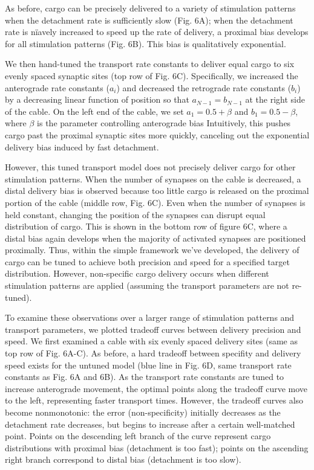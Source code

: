 \documentclass[11pt]{wlpeerj}
\begin{document}
As before, cargo can be precisely delivered to a variety of stimulation patterns when the detachment rate is sufficiently slow (Fig. 6A); when the detachment rate is n\"iavely increased to speed up the rate of delivery, a proximal bias develops for all stimulation patterns (Fig. 6B).
This bias is qualitatively exponential.

We then hand-tuned the transport rate constants to deliver equal cargo to six evenly spaced synaptic sites (top row of Fig. 6C).
Specifically, we increased the anterograde rate constants ($a_i$) and decreased the retrograde rate constants ($b_i$) by a decreasing linear function of position so that $a_{N-1} = b_{N-1}$ at the right side of the cable.
On the left end of the cable, we set $a_1 = 0.5 + \beta$ and $b_1 = 0.5 - \beta$, where $\beta$ is the parameter controlling anterograde bias
Intuitively, this pushes cargo past the proximal synaptic sites more quickly, canceling out the exponential delivery bias induced by fast detachment.

However, this tuned transport model does not precisely deliver cargo for other stimulation patterns.
When the number of synapses on the cable is decreased, a distal delivery bias is observed because too little cargo is released on the proximal portion of the cable (middle row, Fig. 6C).
Even when the number of synapses is held constant, changing the position of the synapses can disrupt equal distribution of cargo. This is shown in the bottom row of figure 6C, where a distal bias again develops when the majority of activated synapses are positioned proximally.
Thus, within the simple framework we've developed, the delivery of cargo can be tuned to achieve both precision and speed for a specified target distribution.
However, non-specific cargo delivery occurs when different stimulation patterns are applied (assuming the transport parameters are not re-tuned).

To examine these observations over a larger range of stimulation patterns and transport parameters, we plotted tradeoff curves between delivery precision and speed.
We first examined a cable with six evenly spaced delivery sites (same as top row of Fig. 6A-C).
As before, a hard tradeoff between specifity and delivery speed exists for the untuned model (blue line in Fig. 6D, same transport rate constants as Fig. 6A and 6B).
As the transport rate constants are tuned to increase anterograde movement, the optimal points along the tradeoff curve move to the left, representing faster transport times.
However, the tradeoff curves also become nonmonotonic: the error (non-specificity) initially decreases as the detachment rate decreases, but begins to increase after a certain well-matched point.
Points on the descending left branch of the curve represent cargo distributions with proximal bias (detachment is too fast); points on the ascending right branch correspond to distal bias (detachment is too slow).
\end{document}
